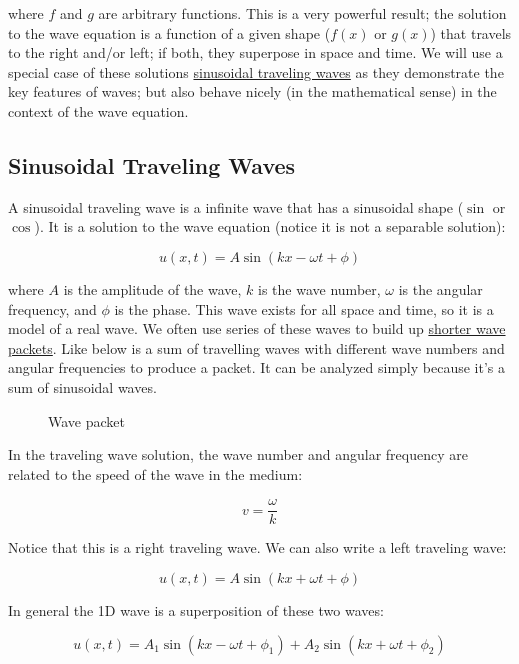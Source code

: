 where \(f\) and \(g\) are arbitrary functions. This is a very powerful
result; the solution to the wave equation is a function of a given shape
(\(f(x)\) or \(g(x)\)) that travels to the right and/or left; if both,
they superpose in space and time. We will use a special case of these
solutions
\href{https://en.wikipedia.org/wiki/Sinusoidal_plane_wave}{sinusoidal
traveling waves} as they demonstrate the key features of waves; but also
behave nicely (in the mathematical sense) in the context of the wave
equation.

\subsection{Sinusoidal Traveling
Waves}\label{sinusoidal-traveling-waves}

A sinusoidal traveling wave is a infinite wave that has a sinusoidal
shape (\(\sin\) or \(\cos\)). It is a solution to the wave equation
(notice it is not a separable solution):

\[u(x,t) = A \sin(kx - \omega t + \phi)\]

where \(A\) is the amplitude of the wave, \(k\) is the wave number,
\(\omega\) is the angular frequency, and \(\phi\) is the phase. This
wave exists for all space and time, so it is a model of a real wave. We
often use series of these waves to build up
\href{https://en.wikipedia.org/wiki/Wave_packet}{shorter wave packets}.
Like below is a sum of travelling waves with different wave numbers and
angular frequencies to produce a packet. It can be analyzed simply
because it's a sum of sinusoidal waves.

\begin{figure}
\centering
{}
\caption{Wave packet}
\end{figure}

In the traveling wave solution, the wave number and angular frequency
are related to the speed of the wave in the medium:

\[v = \frac{\omega}{k}\]

Notice that this is a right traveling wave. We can also write a left
traveling wave:

\[u(x,t) = A \sin(kx + \omega t + \phi)\]

In general the 1D wave is a superposition of these two waves:

\[u(x,t) = A_1 \sin(kx - \omega t + \phi_1) + A_2 \sin(kx + \omega t + \phi_2)\]

